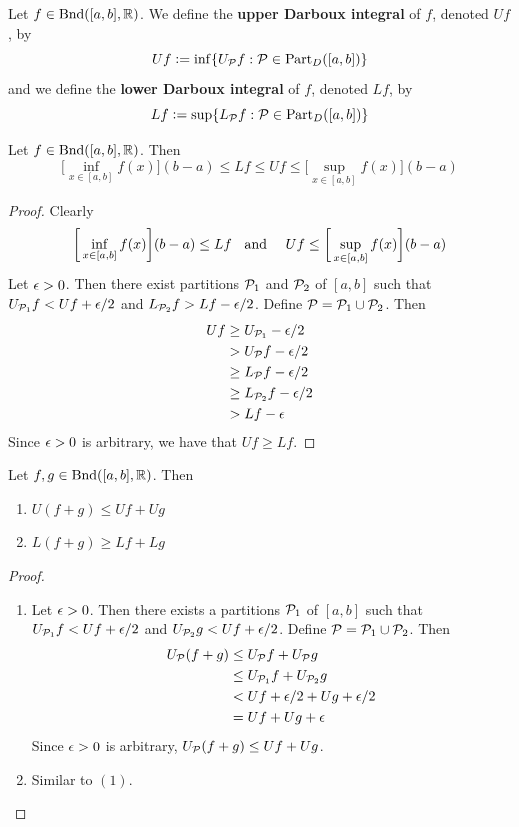 \documentclass{book}
\begin{document}
	\begin{defn}  
		Let $f \in \text{Bnd}([a,b], \mathbb{R})$. We define the \textbf{upper Darboux integral} of $f$, denoted $U f$, by
		$$Uf \vcentcolon= \inf \{U_{\mathcal{P}} f: \mathcal{P} \in \text{Part}_D([a,b]) \}$$
		and we define the \textbf{lower Darboux integral} of $f$, denoted $L f$, by 
		$$Lf \vcentcolon= \sup \{L_{\mathcal{P}} f: \mathcal{P} \in \text{Part}_D([a,b]) \}$$ 
	\end{defn}
	
	\begin{ex}  
		Let $f \in \text{Bnd}([a,b], \mathbb{R})$. Then $$ \bigg[\inf_{x \in [a,b]} f(x) \bigg] (b-a) \leq Lf \leq Uf \leq \bigg[\sup_{x \in [a,b]} f(x) \bigg] (b-a)$$
	\end{ex}
	
	\begin{proof}
		Clearly 
		$$\bigg[\inf_{x \in [a,b]} f(x) \bigg] (b-a) \leq Lf \hspace{.2cm } \text{ and } \quad  Uf \leq \bigg[\sup_{x \in [a,b]} f(x) \bigg] (b-a)$$ 
		Let $\epsilon >0$. Then there exist partitions $\mathcal{P}_1$ and $\mathcal{P}_2$ of $[a,b]$ such that $U_{\mathcal{P}_1} f < U f + \epsilon/2$ and $L_{\mathcal{P}_2} f > Lf - \epsilon/2 $. Define $\mathcal{P} = \mathcal{P}_1 \cup \mathcal{P}_2$. Then 
		\begin{align*}
			Uf 
			& \geq U_{\mathcal{P}_1}  - \epsilon/2 \\
			&> U_{\mathcal{P}} f - \epsilon/2 \\
			&\geq L_{\mathcal{P}} f -\epsilon/2 \\
			&\geq L_{\mathcal{P}_2} f -\epsilon/2 \\
			&> L f - \epsilon
		\end{align*} 
		Since $\epsilon >0$ is arbitrary, we have that $Uf \geq Lf$.
	\end{proof}
	
	\begin{ex}  
		Let $f, g \in \text{Bnd}([a,b], \mathbb{R})$. Then 
		\begin{enumerate}
			\item $U(f+g) \leq U f + U g$
			\item $L(f+g) \geq L f + L g$
		\end{enumerate}
	\end{ex}
	
	\begin{proof}\
		\begin{enumerate}
			\item Let $\epsilon >0$. Then there exists a partitions $\mathcal{P}_1$ of $[a,b]$ such that $U_{\mathcal{P}_1} f < U f + \epsilon/2$ and $U_{\mathcal{P}_2} g < U f + \epsilon/2$. Define $\mathcal{P} = \mathcal{P}_1 \cup \mathcal{P}_2$. Then 
			\begin{align*}
				U_{\mathcal{P}}(f +g) 
				&\leq U_{\mathcal{P}} f + U_{\mathcal{P}} g \\
				&\leq U_{\mathcal{P}_1} f + U_{\mathcal{P}_2} g \\
				&< U f + \epsilon/2 +  U g + \epsilon/2 \\
				&= Uf + Ug + \epsilon
			\end{align*}
			Since $\epsilon >0$ is arbitrary, $U_{\mathcal{P}}(f +g)  \leq Uf + Ug$.
			\item Similar to $(1)$.
		\end{enumerate}
	\end{proof}
	
\end{document}
